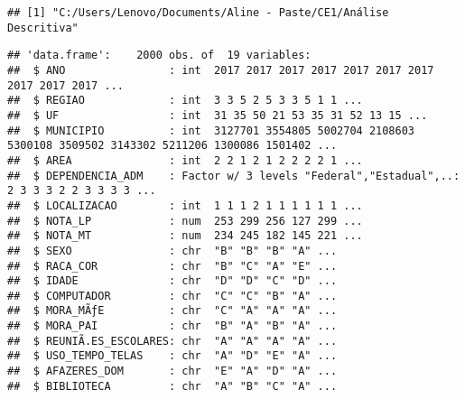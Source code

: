 \documentclass[
]{article}
\newenvironment{Shaded}{\begin{snugshade}}{\end{snugshade}}
\newcommand{\AttributeTok}[1]{\textcolor[rgb]{0.77,0.63,0.00}{#1}}
\newcommand{\DecValTok}[1]{\textcolor[rgb]{0.00,0.00,0.81}{#1}}
\newcommand{\FunctionTok}[1]{\textcolor[rgb]{0.00,0.00,0.00}{#1}}
\newcommand{\NormalTok}[1]{#1}
\newcommand{\OtherTok}[1]{\textcolor[rgb]{0.56,0.35,0.01}{#1}}
\newcommand{\SpecialCharTok}[1]{\textcolor[rgb]{0.00,0.00,0.00}{#1}}
\newcommand{\StringTok}[1]{\textcolor[rgb]{0.31,0.60,0.02}{#1}}
\begin{document}
\begin{verbatim}
## [1] "C:/Users/Lenovo/Documents/Aline - Paste/CE1/Análise Descritiva"
\end{verbatim}

\begin{Shaded}
\end{Shaded}

\begin{verbatim}
## 'data.frame':    2000 obs. of  19 variables:
##  $ ANO                : int  2017 2017 2017 2017 2017 2017 2017 2017 2017 2017 ...
##  $ REGIAO             : int  3 3 5 2 5 3 3 5 1 1 ...
##  $ UF                 : int  31 35 50 21 53 35 31 52 13 15 ...
##  $ MUNICIPIO          : int  3127701 3554805 5002704 2108603 5300108 3509502 3143302 5211206 1300086 1501402 ...
##  $ AREA               : int  2 2 1 2 1 2 2 2 2 1 ...
##  $ DEPENDENCIA_ADM    : Factor w/ 3 levels "Federal","Estadual",..: 2 3 3 3 2 2 3 3 3 3 ...
##  $ LOCALIZACAO        : int  1 1 1 2 1 1 1 1 1 1 ...
##  $ NOTA_LP            : num  253 299 256 127 299 ...
##  $ NOTA_MT            : num  234 245 182 145 221 ...
##  $ SEXO               : chr  "B" "B" "B" "A" ...
##  $ RACA_COR           : chr  "B" "C" "A" "E" ...
##  $ IDADE              : chr  "D" "D" "C" "D" ...
##  $ COMPUTADOR         : chr  "C" "C" "B" "A" ...
##  $ MORA_MÃƒE          : chr  "C" "A" "A" "A" ...
##  $ MORA_PAI           : chr  "B" "A" "B" "A" ...
##  $ REUNIÃ.ES_ESCOLARES: chr  "A" "A" "A" "A" ...
##  $ USO_TEMPO_TELAS    : chr  "A" "D" "E" "A" ...
##  $ AFAZERES_DOM       : chr  "E" "A" "D" "A" ...
##  $ BIBLIOTECA         : chr  "A" "B" "C" "A" ...
\end{verbatim}
\end{document}
